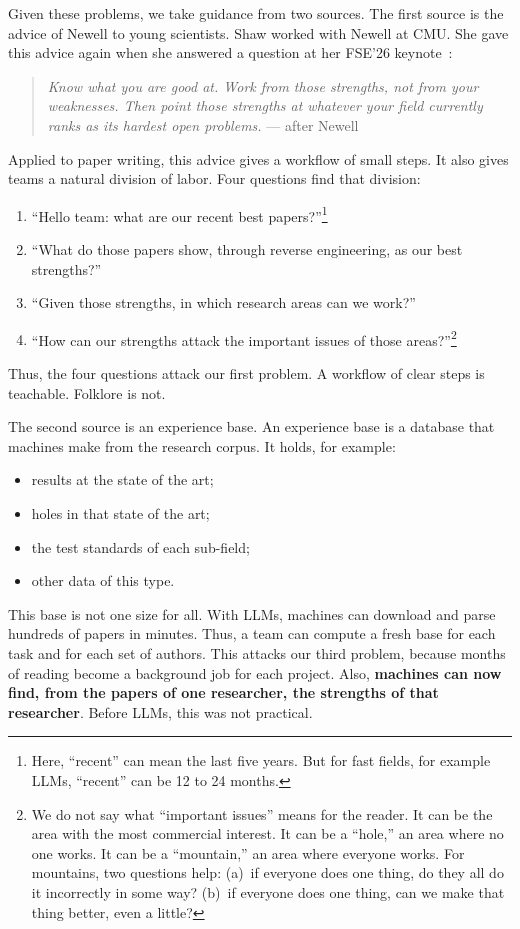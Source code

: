 Given these problems, we take guidance from two sources.
The first source is the advice of Newell to young scientists.
Shaw worked with Newell at CMU.
She gave this advice again when she answered a question at her FSE'26
keynote~\cite{shaw26}:
\begin{quote}
{\em Know what you are good at.
Work from those strengths, not from your weaknesses.
Then point those strengths at whatever your field currently ranks as
its hardest open problems.} --- after Newell~\cite{newell91}
\end{quote}
Applied to paper writing, this advice gives a workflow of small steps.
It also gives teams a natural division of labor.
Four questions find that division:
\begin{enumerate}
\item ``Hello team: what are our recent best papers?''\footnote{Here,
``recent'' can mean the last five years.
But for fast fields, for example LLMs, ``recent'' can be 12 to 24
months.}
\item ``What do those papers show, through reverse engineering, as our
best strengths?''
\item ``Given those strengths, in which research areas can we work?''
\item ``How can our strengths attack the important issues of those
areas?''\footnote{We do not say what ``important issues'' means for
the reader.
It can be the area with the most commercial interest.
It can be a ``hole,'' an area where no one works.
It can be a ``mountain,'' an area where everyone works.
For mountains, two questions help: (a)~if everyone does one thing, do
they all do it incorrectly in some way?
(b)~if everyone does one thing, can we make that thing better, even a
little?}
\end{enumerate}
Thus, the four questions attack our first problem.
A workflow of clear steps is teachable.
Folklore is not.

The second source is an experience base.
An experience base is a database that machines make from the research
corpus.
It holds, for example:
\begin{itemize}
\item results at the state of the art; \item holes in that state of
the art; \item the test standards of each sub-field; \item other data
of this type.
\end{itemize}
This base is not one size for all.
With LLMs, machines can download and parse hundreds of papers in
minutes.
Thus, a team can compute a fresh base for each task and for each set
of authors.
This attacks our third problem, because months of reading become a
background job for each project.
Also, \textbf{machines can now find, from the papers of one
researcher, the strengths of that researcher}.
Before LLMs, this was not practical.

